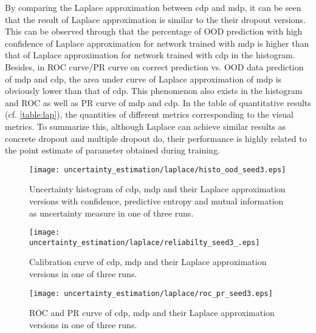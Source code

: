 By comparing the Laplace approximation between cdp and mdp, it can be seen that the result of Laplace approximation is similar to the their dropout versions. This can be observed through that the percentage of OOD prediction with high confidence of Laplace approximation for network trained with mdp is higher than that of Laplace approximation for network trained with cdp in the histogram. Besides, in ROC curve/PR curve on correct prediction vs. OOD data prediction of mdp and cdp, the area under curve of Laplace approximation of mdp is obviously lower than that of cdp. This phenomenon also exists in the histogram and ROC as well as PR curve of mdp and cdp. In the table of quantitative results (cf. \ref{table:lap}), the quantities of different metrics corresponding to the visual metrics. To summarize this, although Laplace can achieve similar results as concrete dropout and multiple dropout do, their performance is highly related to the point estimate of parameter obtained during training.

\begin{figure}[H]		
	\centering
	\texttt{[image: uncertainty\_estimation/laplace/histo\_ood\_seed3.eps]}
	\caption{Uncertainty histogram of cdp, mdp and their Laplace approximation versions with confidence, predictive entropy and mutual information as uncertainty measure in one of three runs.}
	\label{figure:lap_hist}	
\end{figure}

\begin{figure}[H]
	\begin{center}
		\texttt{[image: uncertainty\_estimation/laplace/reliabilty\_seed3\_.eps]}
		\caption{Calibration curve of cdp, mdp and their Laplace approximation versions in one of three runs.}		
		\label{lap_calibration}
	\end{center}
\end{figure}



\begin{figure}[H]
	\begin{center}
		\texttt{[image: uncertainty\_estimation/laplace/roc\_pr\_seed3.eps]}
		\caption{ROC and PR curve of cdp, mdp and their Laplace approximation versions in one of three runs.}		
		\label{lap_roc_pr}
	\end{center}
\end{figure}

